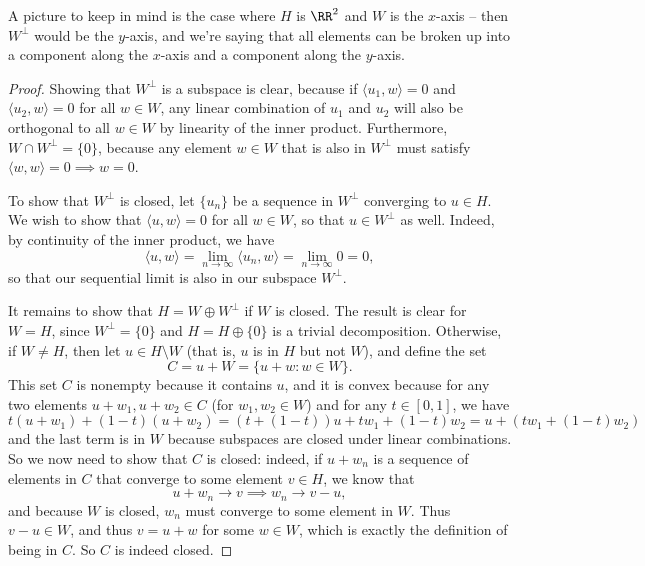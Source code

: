 A picture to keep in mind is the case where $H$ is $\RR^2$ and $W$ is the $x$-axis -- then $W^\perp$ would be the $y$-axis, and we're saying that all elements can be broken up into a component along the $x$-axis and a component along the $y$-axis.

\begin{proof}
Showing that $W^\perp$ is a subspace is clear, because if $\langle u_1, w \rangle = 0$ and $\langle u_2,  w\rangle = 0$ for all $w \in W$, any linear combination of $u_1$ and $u_2$ will also be orthogonal to all $w \in W$ by linearity of the inner product. Furthermore, $W \cap W^\perp = \{0\}$, because any element $w \in W$ that is also in $W^\perp$ must satisfy $\langle w, w \rangle = 0 \implies w = 0$. 

To show that $W^\perp$ is closed, let $\{u_n\}$ be a sequence in $W^\perp$ converging to $u \in H$. We wish to show that $\langle u, w \rangle = 0$ for all $w \in W$, so that $u \in W^\perp$ as well. Indeed, by continuity of the inner product, we have
\[
    \langle u, w \rangle = \lim_{n \to \infty} \langle u_n, w \rangle = \lim_{n \to \infty} 0 = 0,
\]
so that our sequential limit is also in our subspace $W^\perp$. 

It remains to show that $H = W \oplus W^\perp$ if $W$ is closed. The result is clear for $W = H$, since $W^\perp = \{0\}$ and $H = H \oplus \{0\}$ is a trivial decomposition. Otherwise, if $W \ne H$, then let $u \in H \setminus W$ (that is, $u$ is in $H$ but not $W$), and define the set 
\[
    C = u + W = \{u + w: w \in W\}.
\]
This set $C$ is nonempty because it contains $u$, and it is convex because for any two elements $u + w_1, u + w_2 \in C$ (for $w_1, w_2 \in W$) and for any $t \in [0, 1]$, we have
\[
    t(u + w_1) + (1-t) (u + w_2) = (t + (1-t)) u + tw_1 + (1-t) w_2 = u + \left(tw_1 + (1-t) w_2\right)
\]
and the last term is in $W$ because subspaces are closed under linear combinations. So we now need to show that $C$ is closed: indeed, if $u + w_n$ is a sequence of elements in $C$ that converge to some element $v \in H$, we know that 
\[
    u + w_n \to v \implies w_n \to v- u,
\]
and because $W$ is closed, $w_n$ must converge to some element in $W$. Thus $v - u \in W$, and thus $v = u + w$ for some $w \in W$, which is exactly the definition of being in $C$. So $C$ is indeed closed.


\end{proof}
